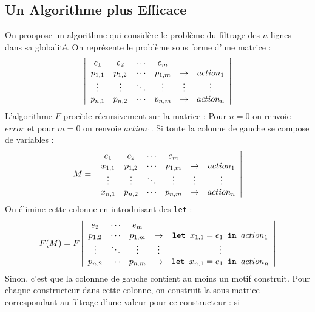 \documentclass{cours}
\begin{document}
\subsection{Un Algorithme plus Efficace}
On proopose un algorithme qui considère le problème du filtrage des $n$ lignes dans sa globalité. On représente le problème sous forme d'une matrice :
\[
    \left|\begin{array}{cccccc}
            e_{1}    & e_{2}    & \cdots & e_{m}    &             &            \\
            p_{1, 1} & p_{1, 2} & \cdots & p_{1, m} & \rightarrow & action_{1} \\
            \vdots   & \vdots   & \ddots & \vdots   & \vdots      & \vdots     \\
            p_{n, 1} & p_{n, 2} & \cdots & p_{n, m} & \rightarrow & action_{n} \\
        \end{array}\right|
\]
L'algorithme $F$ procède récursivement sur la matrice :
Pour $n = 0$ on renvoie $error$ et pour $m = 0$ on renvoie $action_{1}$.
Si toute la colonne de gauche se compose de variables :
\[
    M = \left|\begin{array}{cccccc}
            e_{1}    & e_{2}    & \cdots & e_{m}    &             &            \\
            x_{1, 1} & p_{1, 2} & \cdots & p_{1, m} & \rightarrow & action_{1} \\
            \vdots   & \vdots   & \ddots & \vdots   & \vdots      & \vdots     \\
            x_{n, 1} & p_{n, 2} & \cdots & p_{n, m} & \rightarrow & action_{n} \\
        \end{array}\right|
\]
On élimine cette colonne en introduisant des \texttt{let} :
\[
    F(M) = F \left|\begin{array}{ccccc}
            e_{2}    & \cdots & e_{m}    &             &                                     \\
            p_{1, 2} & \cdots & p_{1, m} & \rightarrow & \texttt{let } x_{1,1} = e_{1} \texttt{ in }{action_{1}} \\
            \vdots   & \ddots & \vdots   & \vdots      & \vdots                              \\
            p_{n, 2} & \cdots & p_{n, m} & \rightarrow & \texttt{let } x_{n,1} = e_{1} \texttt{ in }{action_{n}} \\
        \end{array}\right|
\]
Sinon, c'est que la colonnne de gauche contient au moins un motif construit. Pour chaque constructeur dans cette colonne, on construit la sous-matrice correspondant au filtrage d'une valeur pour ce constructeur : si
\end{document}
